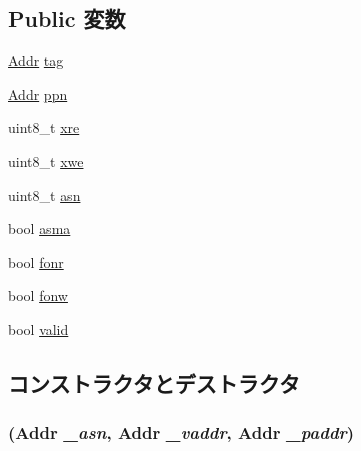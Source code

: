\subsection*{Public 変数}
\begin{DoxyCompactItemize}
\item 
\hyperlink{classm5_1_1params_1_1Addr}{Addr} \hyperlink{structAlphaISA_1_1TlbEntry_a37fe97093e3df5a68f35c18538628836}{tag}
\item 
\hyperlink{classm5_1_1params_1_1Addr}{Addr} \hyperlink{structAlphaISA_1_1TlbEntry_ac015791e15ce4dda4e015f8da6a1f910}{ppn}
\item 
uint8\_\-t \hyperlink{structAlphaISA_1_1TlbEntry_adffc88fa4f56bc343e0b278168618a61}{xre}
\item 
uint8\_\-t \hyperlink{structAlphaISA_1_1TlbEntry_a6e9e8d2fb06547035ddbbff85a8f5212}{xwe}
\item 
uint8\_\-t \hyperlink{structAlphaISA_1_1TlbEntry_af93960fdeafb7442fd6c1bffd85480e5}{asn}
\item 
bool \hyperlink{structAlphaISA_1_1TlbEntry_a4c2313f46fd0f7d51da7f34d5677b957}{asma}
\item 
bool \hyperlink{structAlphaISA_1_1TlbEntry_a94e6f5a70e9acb00a86980a45091e108}{fonr}
\item 
bool \hyperlink{structAlphaISA_1_1TlbEntry_aadb4ef16aa2c522df6bbcdfb6ab396f6}{fonw}
\item 
bool \hyperlink{structAlphaISA_1_1TlbEntry_a28e3c179a86f337095088b3ca02a2b2a}{valid}
\end{DoxyCompactItemize}


\subsection{コンストラクタとデストラクタ}
\hypertarget{structAlphaISA_1_1TlbEntry_ad54289f363defd185361d4c812a4fca5}{
\subsubsection[{TlbEntry}]{ ({\bf Addr} {\em \_\-asn}, \/  {\bf Addr} {\em \_\-vaddr}, \/  {\bf Addr} {\em \_\-paddr})}}
\label{structAlphaISA_1_1TlbEntry_ad54289f363defd185361d4c812a4fca5}



